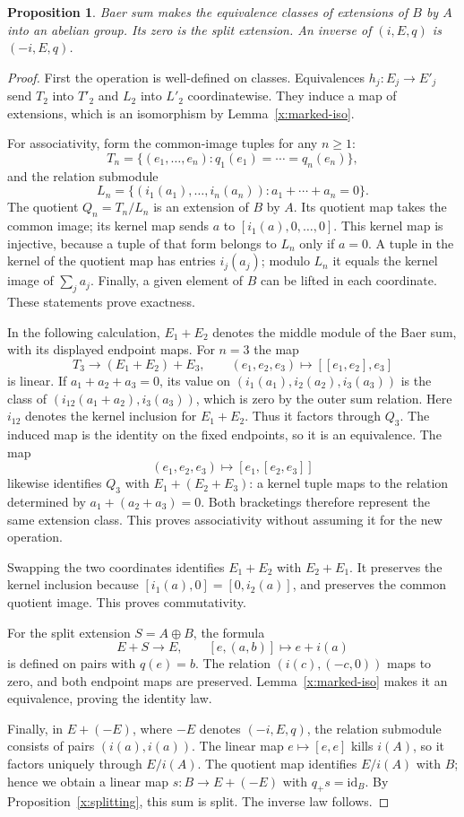 \documentclass[11pt]{article}
\newtheorem{proposition}[theorem]{Proposition}
\theoremstyle{definition}
\theoremstyle{remark}\newtheorem{remark}[theorem]{Remark}
\newcommand{\id}{\mathrm{id}}
\begin{document}
\begin{proposition}\label{x:baer-group}
Baer sum makes the equivalence classes of extensions of $B$ by $A$ into
an abelian group. Its zero is the split extension. An inverse of
$(i,E,q)$ is $(-i,E,q)$.
\end{proposition}
\begin{proof}
First the operation is well-defined on classes. Equivalences
$h_j:E_j\to E'_j$ send $T_2$ into $T'_2$ and $L_2$ into $L'_2$
coordinatewise. They induce a map of extensions, which is an isomorphism
by Lemma~\ref{x:marked-iso}.

For associativity, form the common-image tuples for any $n\geq1$:
\[
T_n=\{(e_1,\ldots,e_n):q_1(e_1)=\cdots=q_n(e_n)\},
\]
and the relation submodule
\[
L_n=\{(i_1(a_1),\ldots,i_n(a_n)):a_1+\cdots+a_n=0\}.
\]
The quotient $Q_n=T_n/L_n$ is an extension of $B$ by $A$. Its quotient
map takes the common image; its kernel map sends $a$ to
$[i_1(a),0,\ldots,0]$. This kernel map is injective, because a tuple of
that form belongs to $L_n$ only if $a=0$. A tuple in the kernel of the
quotient map has entries $i_j(a_j)$; modulo $L_n$ it equals the kernel
image of $\sum_j a_j$. Finally, a given element of $B$ can be lifted in
each coordinate. These statements prove exactness.

In the following calculation, $E_1+E_2$ denotes the middle module of
the Baer sum, with its displayed endpoint maps.
For $n=3$ the map
\[
T_3\longrightarrow (E_1+E_2)+E_3,
\qquad (e_1,e_2,e_3)\longmapsto[[e_1,e_2],e_3]
\]
is linear. If $a_1+a_2+a_3=0$, its value on
$(i_1(a_1),i_2(a_2),i_3(a_3))$ is the class of
$(i_{12}(a_1+a_2),i_3(a_3))$, which is zero by the outer sum relation.
Here $i_{12}$ denotes the kernel inclusion for $E_1+E_2$.
Thus it factors through $Q_3$. The induced map is the identity on the
fixed endpoints, so it is an equivalence. The map
\[
(e_1,e_2,e_3)\longmapsto[e_1,[e_2,e_3]]
\]
likewise identifies $Q_3$ with $E_1+(E_2+E_3)$: a kernel tuple maps to
the relation determined by $a_1+(a_2+a_3)=0$. Both bracketings therefore
represent the same extension class. This proves associativity without
assuming it for the new operation.

Swapping the two coordinates identifies $E_1+E_2$ with $E_2+E_1$.
It preserves the kernel inclusion because
$[i_1(a),0]=[0,i_2(a)]$, and preserves the common quotient image.
This proves commutativity.

For the split extension $S=A\oplus B$, the formula
\[
E+S\longrightarrow E,\qquad [e,(a,b)]\longmapsto e+i(a)
\]
is defined on pairs with $q(e)=b$. The relation
$(i(c),(-c,0))$ maps to zero, and both endpoint maps are preserved.
Lemma~\ref{x:marked-iso} makes it an equivalence, proving the identity law.

Finally, in $E+(-E)$, where $-E$ denotes $(-i,E,q)$, the relation
submodule consists of pairs $(i(a),i(a))$. The linear map
$e\mapsto[e,e]$ kills $i(A)$, so it factors uniquely through $E/i(A)$.
The quotient map identifies $E/i(A)$ with $B$; hence we obtain a linear
map $s:B\to E+(-E)$ with $q_+s=\id_B$. By
Proposition~\ref{x:splitting}, this sum is split. The inverse law follows.
\end{proof}
\end{document}
